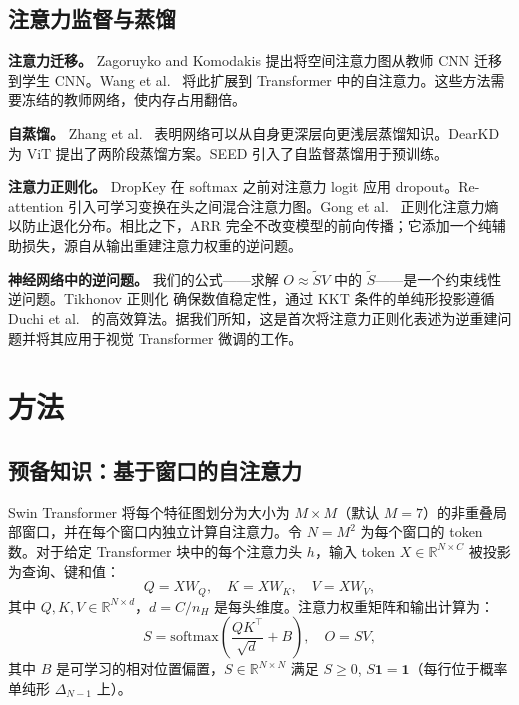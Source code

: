 \documentclass[preprint,12pt]{elsarticle}
\begin{document}
\subsection{注意力监督与蒸馏}

\textbf{注意力迁移。} Zagoruyko and Komodakis \cite{zagoruyko2017paying} 提出将空间注意力图从教师 CNN 迁移到学生 CNN。Wang et al.~\cite{wang2022minivit} 将此扩展到 Transformer 中的自注意力。这些方法需要冻结的教师网络，使内存占用翻倍。

\textbf{自蒸馏。} Zhang et al.~\cite{zhang2019your} 表明网络可以从自身更深层向更浅层蒸馏知识。DearKD \cite{chen2022dearkd} 为 ViT 提出了两阶段蒸馏方案。SEED \cite{fang2021seed} 引入了自监督蒸馏用于预训练。

\textbf{注意力正则化。} DropKey \cite{li2023dropkey} 在 softmax 之前对注意力 logit 应用 dropout。Re-attention \cite{zhou2021deepvit} 引入可学习变换在头之间混合注意力图。Gong et al.~\cite{gong2021improve} 正则化注意力熵以防止退化分布。相比之下，ARR 完全不改变模型的前向传播；它添加一个纯辅助损失，源自从输出重建注意力权重的逆问题。

\textbf{神经网络中的逆问题。} 我们的公式——求解 $O \approx \tilde{S}V$ 中的 $\tilde{S}$——是一个约束线性逆问题。Tikhonov 正则化 \cite{tikhonov1977solutions} 确保数值稳定性，通过 KKT 条件的单纯形投影遵循 Duchi et al.~\cite{duchi2008efficient} 的高效算法。据我们所知，这是首次将注意力正则化表述为逆重建问题并将其应用于视觉 Transformer 微调的工作。

\section{方法}

\subsection{预备知识：基于窗口的自注意力}

Swin Transformer \cite{liu2021swin} 将每个特征图划分为大小为 $M \times M$（默认 $M = 7$）的非重叠局部窗口，并在每个窗口内独立计算自注意力。令 $N = M^2$ 为每个窗口的 token 数。对于给定 Transformer 块中的每个注意力头 $h$，输入 token $X \in \mathbb{R}^{N \times C}$ 被投影为查询、键和值：
\begin{equation}
Q = XW_Q, \quad K = XW_K, \quad V = XW_V,
\end{equation}
其中 $Q, K, V \in \mathbb{R}^{N \times d}$，$d = C / n_H$ 是每头维度。注意力权重矩阵和输出计算为：
\begin{equation}
S = \mathrm{softmax}\!\left(\frac{QK^\top}{\sqrt{d}} + B\right), \quad O = SV,
\end{equation}
其中 $B$ 是可学习的相对位置偏置，$S \in \mathbb{R}^{N \times N}$ 满足 $S \geq 0$, $S\mathbf{1} = \mathbf{1}$（每行位于概率单纯形 $\Delta_{N-1}$ 上）。
\end{document}
